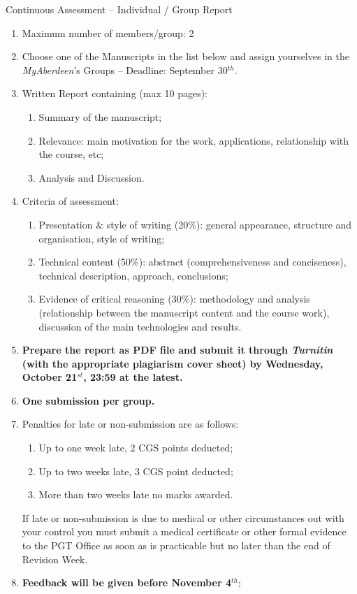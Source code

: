 \documentclass[12pts,a4paper]{report}%
\begin{document}
\begin{center}
{\Large Continuous Assessment -- Individual / Group Report}
\end{center}

\begin{enumerate}
%
\item Maximum number of members/group: 2
%
\item Choose one of the Manuscripts in the list below and assign yourselves in the {\it MyAberdeen}'s Groups -- Deadline: September 30$^{th}$.
%
\item Written Report containing (max 10 pages):
  \begin{enumerate}
   \item Summary of the manuscript;
   \item Relevance: main motivation for the work, applications, relationship with the course, etc;
   \item Analysis and Discussion.
  \end{enumerate}
%
\item Criteria of assessment:
  \begin{enumerate}
    \item Presentation $\&$ style of writing (20$\%$): general appearance, structure and organisation, style of writing;
    \item Technical content (50$\%$): abstract (comprehensiveness and conciseness), technical description, approach, conclusions;
    \item Evidence of critical reasoning (30$\%$): methodology and analysis (relationship between the manuscript content and the course work), discussion of the main technologies and results.
  \end{enumerate}
%
\item {\bf Prepare the report as PDF file and submit it through {\it Turnitin} (with the appropriate plagiarism cover sheet) by Wednesday, October 21$^{st}$, 23:59 at the latest.}
%
\item {\bf One submission per group.}
%
\item Penalties for late or non-submission are as follows:
\begin{enumerate}%
\item Up to one week late, 2 CGS points deducted;
\item Up to two weeks late, 3 CGS point deducted;
\item More than two weeks late no marks awarded.
\end{enumerate}
If late or non-submission is due to medical or other circumstances out with your control you must submit a medical certificate or other formal evidence to the PGT Office as soon as is practicable but no later than the end of Revision Week.
%
 \item {\bf Feedback will be given before November 4$^{th}$};
\end{enumerate}
%
\end{document}
